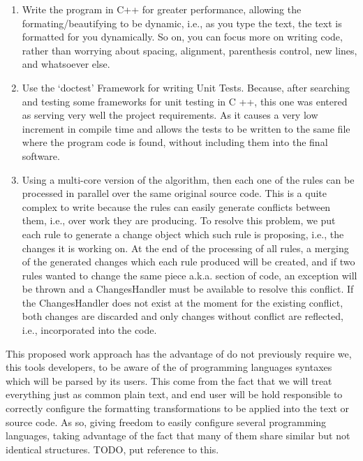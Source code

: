 \begin{enumerate}[leftmargin=*]

    \item Write the program in C++ for greater performance, allowing the
    formating/beautifying to be dynamic, i.e.,
    as you type the text,
    the text is formatted for you dynamically.
    So on,
    you can focus more on writing code,
    rather than worrying about spacing,
    alignment, parenthesis control, new lines, and whatsoever else.

    \item Use the `doctest' Framework for writing Unit Tests. Because,
    after searching and testing some frameworks for unit testing in C ++,
    this one was entered as serving very well the project requirements.
    As it causes a very low increment in compile time and allows the tests to be written to the same file where the
    program code is found,
    without including them into the final software.

    \item Using a multi-core version of the algorithm,
    then each one of the rules can be processed in parallel over the same original source code.
    This is a quite complex to write because the rules can easily generate conflicts between them, i.e.,
    over work they are producing.
    To resolve this problem,
    we put each rule to generate a change object which such rule is proposing, i.e.,
    the changes it is working on.
    At the end of the processing of all rules,
    a merging of the generated changes which each rule produced will be created,
    and if two rules wanted to change the same piece a.k.a.
    section of code,
    an exception will be thrown and a Changes\q Handler must be available to resolve this conflict.
    If the Changes\q Handler does not exist at the moment for the existing conflict,
    both changes are discarded and only changes without conflict are reflected, i.e.,
    incorporated into the code.

\end{enumerate}

This proposed work approach has the advantage of do not previously require we, this tools developers,
to be aware of the of programming languages syntaxes which will be parsed by its users.
This come from the fact that we will treat everything just as common plain text,
and end user will be hold responsible to correctly configure the formatting transformations to be applied into the
text or source code.
As so,
giving freedom to easily configure several programming languages,
taking advantage of the fact that many of them share similar but not identical structures.
TODO,
put reference to this.

